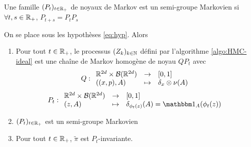\documentclass[10pt,a4paper]{article}
\begin{document}
\begin{Def}
  Une famille $(P_t)_{t \in \mathbb{R}_+}$ de noyaux de Markov est un semi-groupe Markovien si $\forall t,s \in \mathbb{R}_+$, $P_{t+s} = P_t P_s$
\end{Def}

\begin{Prop}
  On se place sous les hypothèses \eqref{eq:hyp}. Alors

  \begin{enumerate}
  \item Pour tout $t \in \mathbb{R}_+$, le processus $(Z_k)_{k \in \mathbb{N}}$ défini par l'algorithme \ref{algo:HMC-ideal} est une chaîne de Markov homogène de noyau $QP_t$ avec
  $$
  Q : { \begin{array}{lcl} 
    \mathbb{R}^{2d} \times \mathcal{B}(\mathbb{R}^{2d}) & \to & [0,1] \\
    ((x,p), A) & \mapsto & \delta_x \otimes \nu(A)
     \end{array} }
  $$
  $$
  P_t : \fundef{
    \rset^{2d} \times \calB(\rset^{2d}) & \to & [0,1] \\
    (z, A) & \mapsto & \delta_{\phi_t(z)}(A) = \ind_A(\phi_t(z))
    }
  $$
\item $(P_t)_{t \in \mathbb{R}_+}$ est un semi-groupe Markovien
\item Pour tout $t \in \mathbb{R}_+$, $\widetilde{\pi}$ est $P_t$-invariante. 
  \end{enumerate}
\end{Prop}
\end{document}
